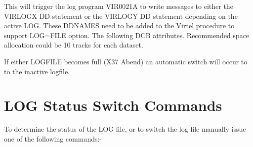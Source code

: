 \documentclass[letterpaper,10pt,english]{sphinxmanual}
\begin{document}
\begin{sphinxVerbatim}[commandchars=\\\{\}]
\end{sphinxVerbatim}

This will trigger the log program VIR0021A to write messages to either the VIRLOGX DD statement or the VIRLOGY DD statement depending on the active LOG. These DDNAMES need to be added to the Virtel procedure to support LOG=FILE option. The following DCB attributes. Recommended space allocation could be 10 tracks for each dataset.

\begin{sphinxVerbatim}[commandchars=\\\{\}]
  
      
\end{sphinxVerbatim}

If either LOGFILE becomes full (X37 Abend) an automatic switch will occur to to the inactive logfile.

\ignorespaces 
{}\ignorespaces 

\section{LOG Status \textbar{} Switch Commands}
\label{\detokenize{audit_operations_ and_performance:log-status-switch-commands}}\label{\detokenize{audit_operations_ and_performance:index-10}}
To determine the status of the LOG file, or to switch the log file manually issue one of the following commands:-

\begin{sphinxVerbatim}[commandchars=\\\{\}]
                 
                
\end{sphinxVerbatim}
\end{document}
